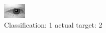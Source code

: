 \begin{figure}[h!]
\begin{center}
\includegraphics[width=0.60\columnwidth]{figures/ID455_class_1_target_2.png}
\end{center}
\caption{ Classification: 1 actual target: 2}
\label{fig:ID455_class_1_target_2}
\end{figure}
